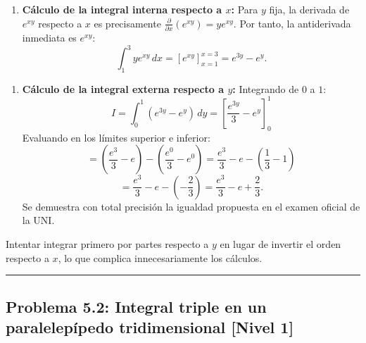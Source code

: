 \documentclass[11pt,a4paper]{article}
\begin{document}
\begin{enumerate}[label=\textbf{\arabic*.}]
\item \textbf{Cálculo de la integral interna respecto a $x$:}
Para $y$ fija, la derivada de $e^{xy}$ respecto a $x$ es precisamente $\frac{\partial}{\partial x}(e^{xy}) = y e^{xy}$.
Por tanto, la antiderivada inmediata es $e^{xy}$:
\begin{equation*}
\int_1^3 y e^{xy} \, dx = \left[ e^{xy} \right]_{x=1}^{x=3} = e^{3y} - e^y.
\end{equation*}
\end{enumerate}

\begin{enumerate}[label=\textbf{\arabic*.}]
\item \textbf{Cálculo de la integral externa respecto a $y$:}
Integrando de $0$ a $1$:
\begin{equation*}
I = \int_0^1 (e^{3y} - e^y) \, dy = \left[ \frac{e^{3y}}{3} - e^y \right]_0^1
\end{equation*}
Evaluando en los límites superior e inferior:
\begin{equation*}
= \left( \frac{e^3}{3} - e \right) - \left( \frac{e^0}{3} - e^0 \right) = \frac{e^3}{3} - e - \left(\frac{1}{3} - 1\right)
\end{equation*}
\begin{equation*}
= \frac{e^3}{3} - e - \left(-\frac{2}{3}\right) = \frac{e^3}{3} - e + \frac{2}{3}.
\end{equation*}
Se demuestra con total precisión la igualdad propuesta en el examen oficial de la UNI.
\end{enumerate}

\begin{trapbox}
Intentar integrar primero por partes respecto a $y$ en lugar de invertir el orden respecto a $x$, lo que complica innecesariamente los cálculos.
\end{trapbox}

\vspace{0.5cm}
\hrule
\vspace{0.5cm}

\subsection*{Problema 5.2: Integral triple en un paralelepípedo tridimensional \hfill \color{primaryblue}\small[Nivel 1]}
\end{document}
